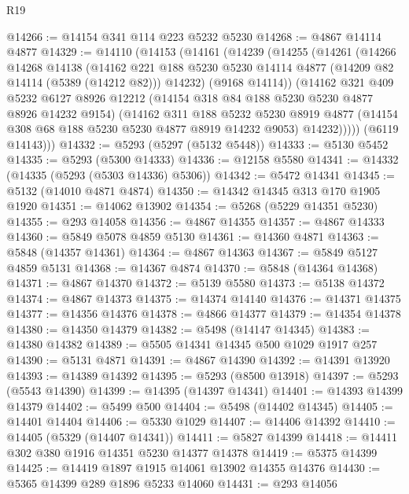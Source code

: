 \begin{lexlean}{R19}
\begin{coremodule}
@14266 := @14154 @341 @114 @223 @5232 @5230
@14268 := @4867 @14114 @4877
@14329 := @14110
    (@14153
      (@14161
        (@14239
          (@14255
            (@14261
              (@14266
                @14268
                @14138
                (@14162
                  @221
                  @188
                  @5230
                  @5230
                  @14114
                  @4877
                  (@14209 @82 @14114 (@5389 (@14212 @82)))
                  @14232)
                (@9168 @14114))
              (@14162
                @321
                @409
                @5232
                @6127
                @8926
                @12212
                (@14154 @318 @84 @188 @5230 @5230 @4877 @8926 @14232 @9154)
                (@14162
                  @311
                  @188
                  @5232
                  @5230
                  @8919
                  @4877
                  (@14154 @308 @68 @188 @5230 @5230 @4877 @8919 @14232 @9053)
                  @14232)))))
        (@6119 @14143)))
@14332 := @5293 (@5297 (@5132 @5448))
@14333 := @5130 @5452
@14335 := @5293 (@5300 @14333)
@14336 := @12158 @5580
@14341 := @14332 (@14335 (@5293 (@5303 @14336) @5306))
@14342 := @5472 @14341
@14345 := @5132 (@14010 @4871 @4874)
@14350 := @14342 @14345 @313 @170 @1905 @1920
@14351 := @14062 @13902
@14354 := @5268 (@5229 @14351 @5230)
@14355 := @293 @14058
@14356 := @4867 @14355
@14357 := @4867 @14333
@14360 := @5849 @5078 @4859 @5130
@14361 := @14360 @4871
@14363 := @5848 (@14357 @14361)
@14364 := @4867 @14363
@14367 := @5849 @5127 @4859 @5131
@14368 := @14367 @4874
@14370 := @5848 (@14364 @14368)
@14371 := @4867 @14370
@14372 := @5139 @5580
@14373 := @5138 @14372
@14374 := @4867 @14373
@14375 := @14374 @14140
@14376 := @14371 @14375
@14377 := @14356 @14376
@14378 := @4866 @14377
@14379 := @14354 @14378
@14380 := @14350 @14379
@14382 := @5498 (@14147 @14345)
@14383 := @14380 @14382
@14389 := @5505 @14341 @14345 @500 @1029 @1917 @257
@14390 := @5131 @4871
@14391 := @4867 @14390
@14392 := @14391 @13920
@14393 := @14389 @14392
@14395 := @5293 (@8500 @13918)
@14397 := @5293 (@5543 @14390)
@14399 := @14395 (@14397 @14341)
@14401 := @14393 @14399 @14379
@14402 := @5499 @500
@14404 := @5498 (@14402 @14345)
@14405 := @14401 @14404
@14406 := @5330 @1029
@14407 := @14406 @14392
@14410 := @14405 (@5329 (@14407 @14341))
@14411 := @5827 @14399
@14418 := @14411 @302 @380 @1916 @14351 @5230 @14377 @14378
@14419 := @5375 @14399
@14425 := @14419 @1897 @1915 @14061 @13902 @14355 @14376
@14430 := @5365 @14399 @289 @1896 @5233 @14060
@14431 := @293 @14056

\end{coremodule}
\end{lexlean}
